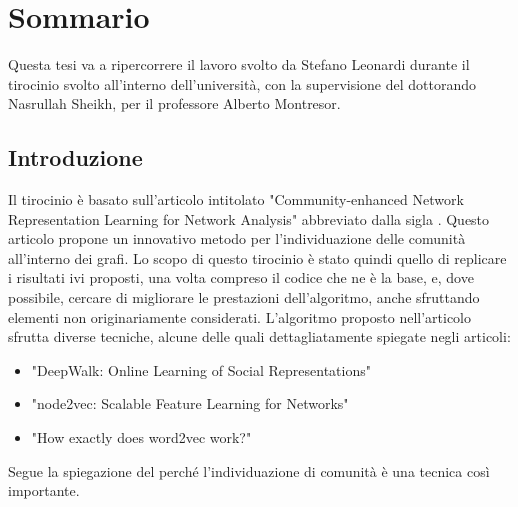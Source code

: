 %
%
%
\chapter{Sommario}
Questa tesi va a ripercorrere il lavoro svolto da Stefano Leonardi durante il tirocinio svolto all'interno dell'università, con la supervisione del dottorando Nasrullah Sheikh, per il professore Alberto Montresor.
%
\section{Introduzione}
Il tirocinio è basato sull'articolo intitolato "Community-enhanced Network Representation Learning for Network Analysis"\cite{CNRL_paper} abbreviato dalla sigla \cnrl. Questo articolo propone un innovativo metodo per l'individuazione delle comunità all'interno dei grafi. Lo scopo di questo tirocinio è stato quindi quello di replicare i risultati ivi proposti, una volta compreso il codice che ne è la base, e, dove possibile, cercare di migliorare le prestazioni dell'algoritmo, anche sfruttando elementi non originariamente considerati.\newline
L'algoritmo proposto nell'articolo sfrutta diverse tecniche, alcune delle quali dettagliatamente spiegate negli articoli:
\begin{itemize}
	\item "DeepWalk: Online Learning of Social Representations"\cite{DW_paper}
	\item "node2vec: Scalable Feature Learning for Networks"\cite{N2V_paper}
	\item "How exactly does word2vec work?"\cite{W2V_paper}
\end{itemize} 
Segue la spiegazione del perché l'individuazione di comunità è una tecnica così importante.
%
